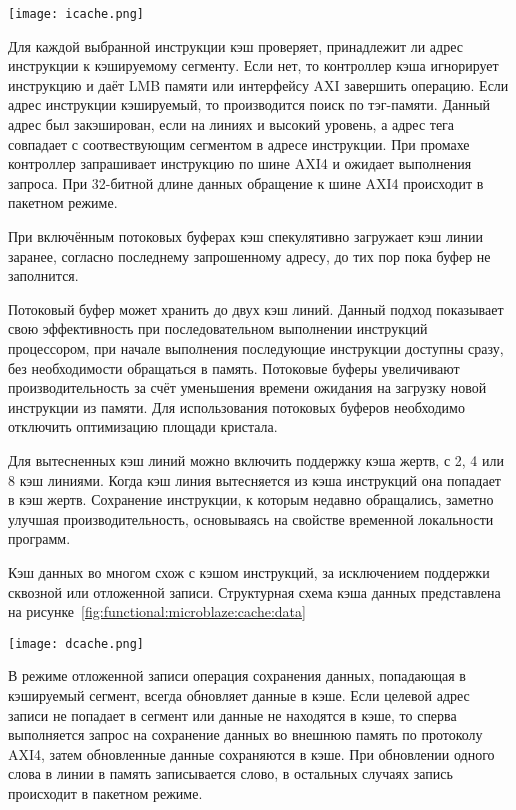 \begin{center}
  \centering
  \texttt{[image: icache.png]}
  \label{fig:functional:microblaze:cache:instruction}
\end{center}

Для каждой выбранной инструкции кэш проверяет, принадлежит ли адрес инструкции
к кэшируемому сегменту. Если нет, то контроллер кэша игнорирует инструкцию и даёт
LMB памяти или интерфейсу AXI завершить операцию. Если адрес инструкции кэшируемый,
то производится поиск по тэг-памяти. Данный адрес был закэширован, если
на линиях  и  высокий уровень, а адрес тега совпадает с
соотвествующим сегментом в адресе инструкции. При промахе контроллер запрашивает
инструкцию по шине AXI4 и ожидает выполнения запроса. При 32-битной длине данных
обращение к шине AXI4 происходит в пакетном режиме.

При включённым потоковых буферах кэш спекулятивно загружает кэш линии заранее,
согласно последнему запрошенному адресу, до тих пор пока буфер не заполнится.

Потоковый буфер может хранить до двух кэш линий. Данный подход показывает свою
эффективность при последовательном выполнении инструкций процессором, при начале
выполнения последующие инструкции доступны сразу, без необходимости обращаться в
память. Потоковые буферы увеличивают производительность за счёт уменьшения
времени ожидания на загрузку новой инструкции из памяти. Для использования
потоковых буферов необходимо отключить оптимизацию площади кристала.

Для вытесненных кэш линий можно включить поддержку кэша жертв, с 2, 4 или 8
кэш линиями. Когда кэш линия вытесняется из кэша инструкций она попадает в кэш
жертв. Сохранение инструкции, к которым недавно обращались, заметно улучшая
производительность, основываясь на свойстве временной локальности программ.

Кэш данных во многом схож с кэшом инструкций, за исключением поддержки
сквозной или отложенной записи. Структурная схема кэша данных представлена
на рисунке~\ref{fig:functional:microblaze:cache:data}

\begin{center}
  \centering
  \texttt{[image: dcache.png]}
  \label{fig:functional:microblaze:cache:data}
\end{center}

В режиме отложенной записи операция сохранения данных, попадающая
в кэшируемый сегмент, всегда обновляет данные в кэше. Если целевой
адрес записи не попадает в сегмент или данные не находятся в кэше,
то сперва выполняется запрос на сохранение данных во внешнюю память
по протоколу AXI4, затем обновленные данные сохраняются в кэше.
При обновлении одного слова в линии в память записывается слово, в
остальных случаях запись происходит в пакетном режиме.

